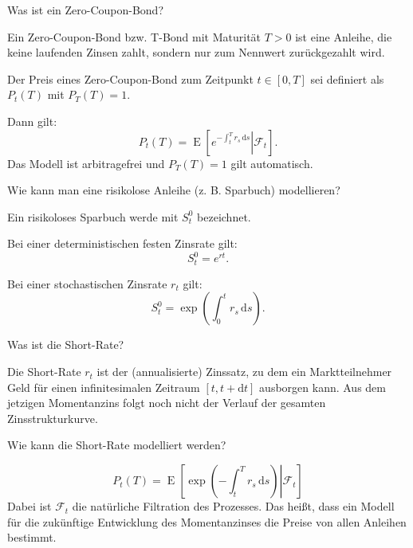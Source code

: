 \begin{QandA}
    \item Was ist ein Zero-Coupon-Bond?
    \begin{answered}
        Ein Zero-Coupon-Bond bzw. T-Bond mit Maturität $T > 0$ ist eine Anleihe, die keine laufenden Zinsen zahlt, sondern nur zum Nennwert zurückgezahlt wird.

        Der Preis eines Zero-Coupon-Bond zum Zeitpunkt $t \in [0, T]$ sei definiert als $P_t(T)$ mit $P_T(T) = 1$.

        Dann gilt:
        \[
            P_t(T) = \operatorname{E} \left[ \left. e^{-\int_{t}^{T} r_s \, \mathrm{d} s} \right| \mathcal{F}_t \right].
        \]
        Das Modell ist arbitragefrei und $P_T(T) = 1$ gilt automatisch.
    \end{answered}

    \item Wie kann man eine risikolose Anleihe (z. B. Sparbuch) modellieren?
    \begin{answered}
        Ein risikoloses Sparbuch werde mit $S_t^0$ bezeichnet.

        Bei einer deterministischen festen Zinsrate gilt:
        \[
            S_t^0 = e^{rt}.
        \]

        Bei einer stochastischen Zinsrate $r_t$ gilt:
        \[
            S_t^0 = \exp\left(\int_{0}^{t} r_s \, \mathrm{d} s\right).
        \]
    \end{answered}

    \item Was ist die Short-Rate?
    \begin{answered}
        Die Short-Rate $r_{t}$ ist der (annualisierte) Zinssatz, zu dem ein Marktteilnehmer Geld für einen infinitesimalen Zeitraum $[t,t+\mathrm{d} t]$ ausborgen kann.
        Aus dem jetzigen Momentanzins folgt noch nicht der Verlauf der gesamten Zinsstrukturkurve.
    \end{answered}

    \item Wie kann die Short-Rate modelliert werden?
    \begin{answered}
        \[
            P_t(T)=\operatorname{E} \left[\left.\exp \left(-\int _{t}^{T}r_{s}\,\mathrm {d} s\right) \right|{\mathcal {F}}_{t}\right]
        \]
        Dabei ist $\mathcal {F}_{t}$ die natürliche Filtration des Prozesses.
        Das heißt, dass ein Modell für die zukünftige Entwicklung des Momentanzinses die Preise von allen Anleihen bestimmt.
    \end{answered}


\end{QandA}
